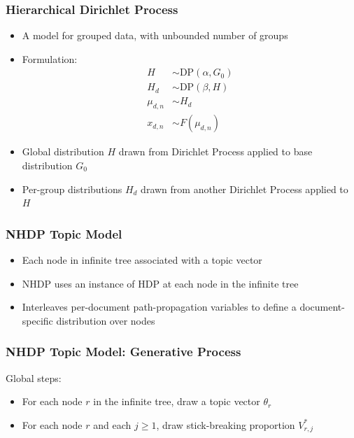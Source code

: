 \documentclass{beamer}
\begin{document}
\begin{frame}
\frametitle{Hierarchical Dirichlet Process}
\begin{itemize}[<+->]
\item A model for grouped data, with unbounded number of groups
\item Formulation:
\begin{align*}
H &\sim \text{DP}(\alpha, G_0) \\
H_d &\sim \text{DP}(\beta, H) \\
\mu_{d,n} &\sim H_d \\
x_{d,n} &\sim F(\mu_{d,n})
\end{align*}
\item Global distribution $H$ drawn from Dirichlet Process applied to base distribution $G_0$
\item Per-group distributions $H_d$ drawn from another Dirichlet Process applied to $H$
\end{itemize}
\end{frame}

\begin{frame}
\frametitle{NHDP Topic Model}
\begin{itemize}[<+->]
\item Each node in infinite tree associated with a topic vector
\item NHDP uses an instance of HDP at each node in the infinite tree
\item Interleaves per-document path-propagation variables to define a document-specific distribution over nodes
\end{itemize}
\end{frame}

\begin{frame}
\frametitle{NHDP Topic Model: Generative Process}
Global steps:
\begin{itemize}[<+->]
\item For each node $r$ in the infinite tree, draw a topic vector $\theta_r$
\item For each node $r$ and each $j \geq 1$, draw stick-breaking proportion $V^*_{r,j}$
\end{itemize}
\end{frame}
\end{document}
